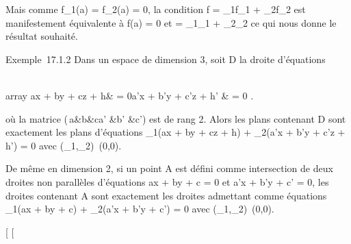 \documentclass[]{article}
\begin{document}
Mais comme f_1(a) = f_2(a) = 0, la condition f =
\lambda_1f_1 + \lambda_2f_2 est manifestement
équivalente à f(a) = 0 et \vecf =
\lambda_1\vecf_1 +
\lambda_2\vecf_2 ce qui nous donne le
résultat souhaité.

Exemple~17.1.2 Dans un espace de dimension 3, soit D la droite
d'équations

\left \\array ax + by +
cz + h& = 0\cr a'x + b'y + c'z + h' & = 0 
\right .

où la matrice \left
(\matrix\,a&b&c\cr a'
&b' &c'\right ) est de rang 2. Alors les plans
contenant D sont exactement les plans d'équations \lambda_1(ax + by +
cz + h) + \lambda_2(a'x + b'y + c'z + h') = 0 avec
(\lambda_1,\lambda_2)\neq~(0,0).

De même en dimension 2, si un point A est défini comme intersection de
deux droites non parallèles d'équations ax + by + c = 0 et a'x + b'y +
c' = 0, les droites contenant A sont exactement les droites admettant
comme équations \lambda_1(ax + by + c) + \lambda_2(a'x + b'y + c')
= 0 avec (\lambda_1,\lambda_2)\neq~(0,0).

[
[
\end{document}
